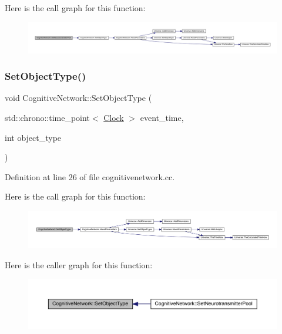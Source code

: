 Here is the call graph for this function\+:
\nopagebreak
\begin{figure}[H]
\begin{center}
\leavevmode
\includegraphics[width=350pt]{class_cognitive_network_aaa10c36c0b0024fa717d8d61a4a06920_cgraph}
\end{center}
\end{figure}
\mbox{\label{class_cognitive_network_ad95a0b25c7f61fc52322938eb13c9e3e}} 
\subsubsection{\texorpdfstring{Set\+Object\+Type()}{SetObjectType()}}
{\footnotesize\ttfamily void Cognitive\+Network\+::\+Set\+Object\+Type (\begin{DoxyParamCaption}\item[{std\+::chrono\+::time\+\_\+point$<$ \hyperlink{universe_8h_a0ef8d951d1ca5ab3cfaf7ab4c7a6fd80}{Clock} $>$}]{event\+\_\+time,  }\item[{int}]{object\+\_\+type }\end{DoxyParamCaption})}



Definition at line 26 of file cognitivenetwork.\+cc.

Here is the call graph for this function\+:
\nopagebreak
\begin{figure}[H]
\begin{center}
\leavevmode
\includegraphics[width=350pt]{class_cognitive_network_ad95a0b25c7f61fc52322938eb13c9e3e_cgraph}
\end{center}
\end{figure}
Here is the caller graph for this function\+:
\nopagebreak
\begin{figure}[H]
\begin{center}
\leavevmode
\includegraphics[width=350pt]{class_cognitive_network_ad95a0b25c7f61fc52322938eb13c9e3e_icgraph}
\end{center}
\end{figure}
\mbox{\label{class_cognitive_network_aaa3929bfba068659e9681f85deaf79cb}} 
